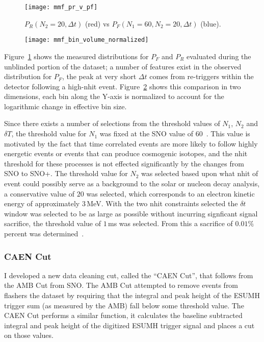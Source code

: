 \begin{figure}[htbp]
    \centering
    \texttt{[image: mmf\_pr\_v\_pf]}
    \caption[Missed Muon Follower Example PDFs]{
        $P_R(N_2=20, \Delta t)$ (red) vs $P_F(N_1=60, N_2=20, \Delta t)$ (blue).}
\label{fig:mmf_sac}
\end{figure}
\begin{figure}[htbp]
    \centering
    \texttt{[image: mmf\_bin\_volume\_normalized]}
    \caption[Two-Dimensional Comparison for Missed Muon Follower]{
}
\label{fig:mmf_sac2}
\end{figure}
Figure~\ref{fig:mmf_sac} shows the measured distributions for $P_{F}$ and $P_{R}$
evaluated during the unblinded portion of the dataset;
a number of features exist in the observed distribution for $P_{F}$,
the peak at very short $\Delta t$ comes from re-triggers within the
detector following a high-nhit event.
Figure~\ref{fig:mmf_sac2} shows this comparison in two dimensions, each
bin along the Y-axis is normalized to account for the logarithmic change
in effective bin size.

Since there exists a number of selections from the threshold values of $N_{1}$,
$N_{2}$ and $\delta T$, the threshold value for $N_{1}$ was fixed at the SNO value
of $60$~\citep{neil_thesis}.
This value is motivated by the fact that time correlated events are more
likely to follow highly energetic events or events that can produce cosmogenic
isotopes, and the nhit threshold for these processes is not effected significantly
by the changes from SNO to SNO+.
The threshold value for $N_{2}$ was selected based upon what nhit of event
could possibly serve as a background to the solar or nucleon decay analysis,
a conservative value of $20$ was selected, which corresponds to an electron kinetic energy
of approximately $3$\,MeV.
With the two nhit constraints selected the $\delta t$ window was selected to
be as large as possible without incurring signficant signal sacrifice,
the threshold value of $1$\,ms was selected.
From this a sacrifice of $0.01\%$ percent was determined~\citep{dc_document}.

\subsubsection{CAEN Cut}
I developed a new data cleaning cut, called the ``CAEN Cut'', that follows from
the AMB Cut from SNO\@.
The AMB Cut attempted to remove events from flashers the dataset by requiring
that the integral and peak height of the ESUMH trigger sum (as measured by the
AMB) fall below some threshold value.
The CAEN Cut performs a similar function, it calculates the baseline subtracted
integral and peak height of the digitized ESUMH trigger signal and places a cut on those values.

